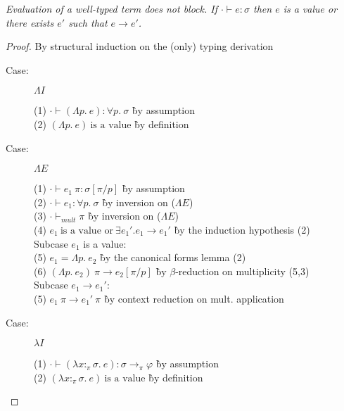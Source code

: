 
\begin{theorem}[Progress]
\emph{Evaluation of a well-typed term does not block. If $\cdot \vdash e : \sigma$ then $e$ is a value or there exists $e'$ such that $e \to e'$.}
\end{theorem}

\begin{proof}
By structural induction on the (only) typing derivation

\begin{description}

\item[Case:] $\Lambda I$
\begin{tabbing}
(1) $\cdot \vdash (\Lambda p.~e) : \forall p.~\sigma$ \` by assumption \\
(2) $(\Lambda p.~e)~\textrm{is a value}$ \` by definition \\
\end{tabbing}

\item[Case:] $\Lambda E$
\begin{tabbing}
(1) $\cdot \vdash e_1~\pi : \sigma[\pi/p]$ \` by assumption \\
(2) $\cdot \vdash e_1 : \forall p.~\sigma$ \` by inversion on ($\Lambda E$) \\
(3) $\cdot \vdash_{mult} \pi$ \` by inversion on ($\Lambda E$) \\
(4) $e_1~\textrm{is a value or}~\exists e_1'. e_1 \longrightarrow e_1'$ \` by the induction hypothesis (2) \\
\textrm{Subcase $e_1$ is a value:}\\
(5) $e_1 = \Lambda p.~e_2$ \` by the canonical forms lemma (2) \\
(6) $(\Lambda p.~e_2)~\pi \longrightarrow e_2[\pi/p]$ \` by $\beta$-reduction on multiplicity (5,3) \\
\textrm{Subcase $e_1 \longrightarrow e_1'$:}\\
(5) $e_1~\pi \longrightarrow e_1'~\pi$ \` by context reduction on mult. application \\
\end{tabbing}

\item[Case:] $\lambda I$
\begin{tabbing}
(1) $\cdot \vdash (\lambda x{:}_\pi\sigma.~e) : \sigma\to_\pi\varphi$ \` by assumption \\
(2) $(\lambda x{:}_\pi\sigma.~e)~\textrm{is a value}$ \` by definition \\
\end{tabbing}


\end{description}
\end{proof}
